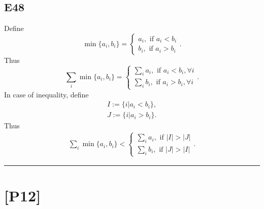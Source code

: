 \documentclass[12pt]{article}
\begin{document}
\subsection*{E48}
Define
\begin{equation*}
    \min \{a_i, b_i\} = 
    \begin{cases}
        a_i, \text{ if } a_i < b_i \\
        b_i, \text{ if } a_i > b_i
    \end{cases}
    .
\end{equation*}
Thus
\begin{equation*}
    \sum_i \min \{a_i, b_i\} = 
    \begin{cases}
        \sum_i a_i, \text{ if } a_i < b_i, \forall i \\
        \sum_i b_i, \text{ if } a_i > b_i, \forall i
    \end{cases}
    .
\end{equation*}
In case of inequality, define
\begin{equation*}
    \begin{split}
        I := \{i|a_i < b_i \}, \\
        J := \{i|a_i > b_i\}    .
    \end{split}
\end{equation*}
Thus
\begin{equation*}
    \begin{split}
        \sum_i \min\{a_i, b_i\} <
        \begin{cases}
            \sum_i a_i, \text{ if } |I| > |J| \\
            \sum_i b_i, \text{ if } |J| > |I|
        \end{cases}
        .
    \end{split}
\end{equation*}

\hrule
\vspace{0.1cm}
\section*{[P12]}
\end{document}
